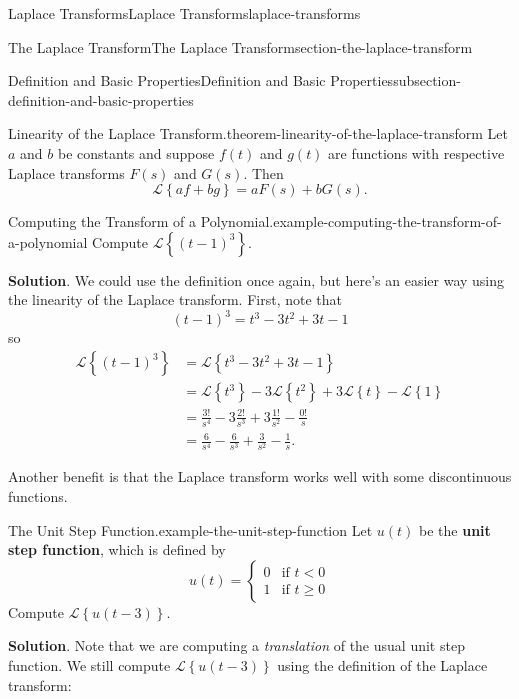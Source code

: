 \documentclass[oneside,10pt,]{book}
\newcommand{\terminology}[1]{\textbf{#1}}
\numberwithin{equation}{section}
\newcommand{\Laplace}[1]{\mathcal{L}\left\{#1\right\}}
\newcommand{\lt}{<}
\newcommand{\amp}{&}
\begin{document}
\begin{chapterptx}{Laplace Transforms}{}{Laplace Transforms}{}{}{laplace-transforms}
\begin{sectionptx}{The Laplace Transform}{}{The Laplace Transform}{}{}{section-the-laplace-transform}
\begin{subsectionptx}{Definition and Basic Properties}{}{Definition and Basic Properties}{}{}{subsection-definition-and-basic-properties}
\begin{theorem}{Linearity of the Laplace Transform.}{}{theorem-linearity-of-the-laplace-transform}
\hypertarget{p-496}{}%
Let \(a\) and \(b\) be constants and suppose \(f(t)\) and \(g(t)\) are functions with respective Laplace transforms \(F(s)\) and \(G(s)\). Then%
\begin{equation*}
\Laplace{af+bg} = aF(s)+bG(s).
\end{equation*}
%
\end{theorem}
\begin{example}{Computing the Transform of a Polynomial.}{example-computing-the-transform-of-a-polynomial}%
\hypertarget{p-497}{}%
Compute \(\Laplace{(t-1)^{3}}\).%
\par\smallskip%
\noindent\textbf{Solution}.\hypertarget{solution-78}{}\quad%
\hypertarget{p-498}{}%
We could use the definition once again, but here's an easier way using the linearity of the Laplace transform. First, note that%
\begin{equation*}
(t-1)^{3} = t^{3} - 3t^{2} +3t - 1
\end{equation*}
so%
\begin{align*}
\Laplace{(t-1)^{3}} \amp= \Laplace{t^{3}-3t^{2}+3t-1}\\
\amp= \Laplace{t^{3}} - 3\Laplace{t^{2}} +3\Laplace{t} - \Laplace{1}\\
\amp= \frac{3!}{s^{4}} - 3\frac{2!}{s^{3}} + 3\frac{1!}{s^{2}} - \frac{0!}{s}\\
\amp= \frac{6}{s^{4}} - \frac{6}{s^{3}} + \frac{3}{s^{2}} - \frac{1}{s}\text{.}
\end{align*}
%
\end{example}
\hypertarget{p-499}{}%
Another benefit is that the Laplace transform works well with some discontinuous functions.%
\begin{example}{The Unit Step Function.}{example-the-unit-step-function}%
\hypertarget{p-500}{}%
Let \(u(t)\) be the \terminology{unit step function}, which is defined by%
\begin{equation*}
u(t) = 
\begin{cases}
0 \amp\text{if }t\lt 0  \\
1 \amp\text{if }t\geq0
\end{cases}
\end{equation*}
Compute \(\Laplace{u(t-3)}\).%
\par\smallskip%
\noindent\textbf{Solution}.\hypertarget{solution-79}{}\quad%
\hypertarget{p-501}{}%
Note that we are computing a \emph{translation} of the usual unit step function. We still compute \(\Laplace{u(t-3)}\) using the definition of the Laplace transform:%
\begin{align*}

\end{align*}
\end{example}
\end{subsectionptx}
\end{sectionptx}
\end{chapterptx}
\end{document}
